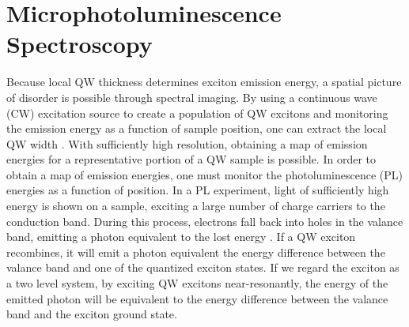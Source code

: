 \section{Microphotoluminescence Spectroscopy}
\indent Because local QW thickness determines exciton emission energy, a spatial picture of disorder is possible through spectral imaging. By using a continuous wave (CW) excitation source to create a population of QW excitons and monitoring the emission energy as a function of sample position, one can extract the local QW width \cite{bristowsep}. With sufficiently high resolution, obtaining a map of emission energies for a representative portion of a QW sample is possible. In order to obtain a map of emission energies, one must monitor the photoluminescence (PL) energies as a function of position. In a PL experiment, light of sufficiently high energy is shown on a sample, exciting a large number of charge carriers to the conduction band. During this process, electrons fall back into holes in the valance band, emitting a photon equivalent to the lost energy \cite{davies}. If a QW exciton recombines, it will emit a photon equivalent the energy difference between the valance band and one of the quantized exciton states. If we regard the exciton as a two level system, by exciting QW excitons near-resonantly, the energy of the emitted photon will be equivalent to the energy difference between the valance band and the exciton ground state. 

